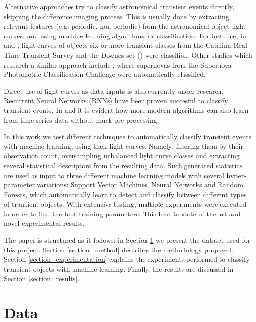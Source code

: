 \documentclass[a4paper,fleqn,usenatbib]{mnras}
\begin{document}

Alternative approaches try to classify astronomical transient events directly, skipping the difference imaging process.
This is usually done by extracting relevant features (e.g. periodic, non-periodic) from the astronomical object light-curves, and using machine learning algorithms for classification. For instance, in \cite{1401.3211} and \cite{1601.03931}, light curves of objects six or more transient classes from the Catalina Real Time Transient Survey and the Downes set (\cite{d05}) were classified. Other studies which research a similar approach include \cite{1603.00882}, where supernovas from the Supernova Photometric Classification Challenge were automatically classified.

Direct use of light curves as data inputs is also currently under research. Recurrent Neural Networks (RNNs) have been proven succesful to classify transient events. In \cite{1606.07442} and \cite{1710.06804} it is evident how more modern algorithms can also learn from time-series data without much pre-processing.

In this work we test different techniques to automatically classify transient events with machine learning, using their light curves. Namely: filtering them by their observation count, oversampling unbalanced light curve classes and extracting several statistical descriptors from the resulting data. Such generated statistics are used as input to three different machine learning models with several hyper-parameter variations: Support Vector Machines, Neural Networks and Random Forests, which automatically learn to detect and classify between different types of transient objects. With extensive testing, multiple experiments were executed in order to find the best training parameters. This lead to state of the art and novel experimental results.

The paper is structured as it follows: in Section \ref{section_data} we present the dataset used for this project. Section \ref{section_method} describes the methodology proposed. Section \ref{section_experimentation} explains the experiments performed to classify transient objects with machine learning. Finally, the results are discussed in Section \ref{section_results}.

\section{Data} \label{section_data}
\end{document}
